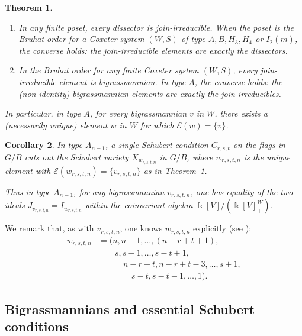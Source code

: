 \documentclass[12pt,dvips]{amsart}
\theoremstyle{plain}
\newtheorem{theorem}{Theorem}[section]
\newtheorem{corollary}[theorem]{Corollary}
\theoremstyle{definition}
\theoremstyle{remark}
\numberwithin{equation}{section}
\def\Ess{{\mathcal{E}}}
\begin{document}
\begin{theorem}\cite{LascouxSchutzenberger, GeckKim, Reading}
\label{dissective-theorem}
\begin{enumerate}
\item[(i)]
In any finite poset, every dissector is join-irreducible.  When the
poset is the Bruhat order for a Coxeter system $(W,S)$ of type $A, B, H_3,H_4$ or
$I_2(m)$, the converse holds:  the join-irreducible elements are exactly the dissectors.
\item[(ii)]
In the Bruhat order for any finite Coxeter system $(W,S)$, every join-irreducible element is bigrassmannian.
In type $A$, the converse holds:  the (non-identity) bigrassmannian elements are exactly the join-irreducibles.
%
\end{enumerate}
In particular, in type $A$, for every bigrassmannian $v$ in $W$, there exists a (necessarily unique) element
$w$ in $W$ for which $\Ess(w)=\{v\}$.
\end{theorem}



\begin{corollary}
In type $A_{n-1}$, a single Schubert condition $C_{r,s,t}$ on the flags
in $G/B$ cuts out the Schubert variety $X_{w_{r,s,t,n}}$ in $G/B$, where
$w_{r,s,t,n}$ is the unique element with $\Ess(w_{r,s,t,n})=\{v_{r,s,t,n}\}$ 
as in Theorem~\ref{dissective-theorem}.

Thus in type $A_{n-1}$, for any bigrassmannian 
$v_{r,s,t,n}$, one has equality of
the two ideals $J_{v_{r,s,t,n}}=I_{w_{r,s,t,n}}$ within the coinvariant algebra
$\Bbbk[V]/(\Bbbk[V]^W_+)$.
\end{corollary}

\noindent
We remark that, as with $v_{r,s,t,n}$, one knows $w_{r,s,t,n}$ explicitly 
(see \cite[\S 8]{Reading}):
$$
\begin{aligned}
w_{r,s,t,n} &=(n, n-1, \ldots,(n-r+t+1), \\
          &  \qquad s, s-1, \ldots, s-t+1, \\
           & \quad \qquad n-r+t,n-r+t-3, \ldots,s+1,\\
           & \qquad \qquad s-t,s-t-1,\ldots,1).
\end{aligned}
$$


\subsection{Bigrassmannians and essential Schubert conditions}
\label{essential-subsection}
\end{document}
